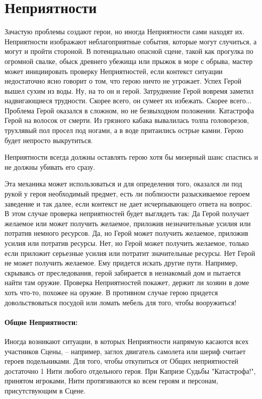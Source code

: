 \section{Неприятности}

Зачастую проблемы создают герои, но иногда Неприятности сами находят их. Неприятности изображают неблагоприятные события, которые могут случиться, а могут и пройти стороной. В потенциально опасной сцене, такой как прогулка по огромной свалке, обыск древнего убежища или прыжок в море с обрыва, мастер может инициировать проверку Неприятностей, если контекст ситуации недостаточно ясно говорит о том, что герою ничто не угрожает.
\trouble
{Успех}%
{Герой вышел сухим из воды. Ну, на то он и герой.}%
{Затруднение}%
{Герой вовремя заметил надвигающиеся трудности. Скорее всего, он сумеет их избежать. Скорее всего...}%
{Проблема}%
{Герой оказался в сложном, но не безвыходном положении.}%
{Катастрофа}%
{Герой на волосок от смерти. Из грязного кабака вывалилась толпа головорезов, трухлявый пол просел под ногами, а в воде притаились острые камни. Герою будет непросто выкрутиться.}%
\begin{tcolorbox}
Неприятности всегда должны оставлять герою хотя бы мизерный шанс спастись и не должны убивать его сразу.
\end{tcolorbox}
Эта механика может использоваться и для определения того, оказался ли под рукой у героя необходимый предмет, есть ли поблизости разыскиваемое героем заведение и так далее, если контекст не дает исчерпывающего ответа на вопрос. В этом случае проверка неприятностей будет выглядеть так: 
\trouble
{Да}%
{Герой получает желаемое или может получить желаемое, приложив незначительные усилия или потратив немного ресурсов.}%
{Да, но}%
{Герой может получить желаемое, приложив усилия или потратив ресурсы.}%
{Нет, но}%
{Герой может получить желаемое, только если приложит серьезные усилия или потратит значительные ресурсы.}%
{Нет}%
{Герой не может получить желаемое. Ему придется искать другие пути.}%
Например, скрываясь от преследования, герой забирается в незнакомый дом и пытается найти там оружие. Проверка Неприятностей покажет, держит ли хозяин в доме хоть что-то, похожее на оружие. В противном случае герою придется довольствоваться посудой или ломать мебель для того, чтобы вооружиться!
\paragraph{Общие Неприятности:} Иногда возникают ситуации, в которых Неприятности напрямую касаются всех участников Сцены, – например, заглох двигатель самолета или шериф считает героев подельниками.
\newline Для того, чтобы откупиться от Общих неприятностей достаточно 1 Нити любого отдельного героя.
\newline При Капризе Судьбы "Катастрофа!", принятом игроками, Нити протягиваются ко всем героям и персонам, присутствующим в Сцене.
